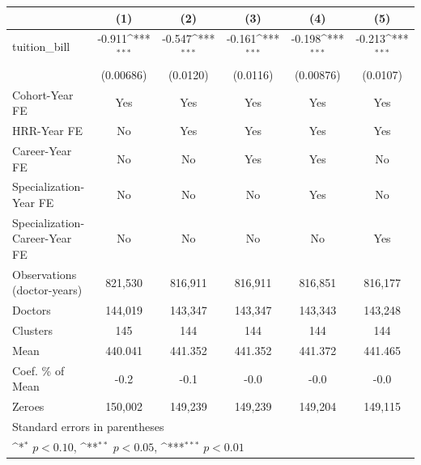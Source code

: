 {
\def\sym#1{\ifmmode^{#1}\else\(^{#1}\)\fi}
\begin{tabular}{l*{5}{c}}
\hline\hline
                    &\multicolumn{1}{c}{(1)}         &\multicolumn{1}{c}{(2)}         &\multicolumn{1}{c}{(3)}         &\multicolumn{1}{c}{(4)}         &\multicolumn{1}{c}{(5)}         \\
\hline
tuition\_bill        &      -0.911\sym{***}&      -0.547\sym{***}&      -0.161\sym{***}&      -0.198\sym{***}&      -0.213\sym{***}\\
                    &   (0.00686)         &    (0.0120)         &    (0.0116)         &   (0.00876)         &    (0.0107)         \\
[1em]
Cohort-Year FE      &         Yes         &         Yes         &         Yes         &         Yes         &         Yes         \\
[1em]
HRR-Year FE         &          No         &         Yes         &         Yes         &         Yes         &         Yes         \\
[1em]
Career-Year FE      &          No         &          No         &         Yes         &         Yes         &          No         \\
[1em]
Specialization-Year FE&          No         &          No         &          No         &         Yes         &          No         \\
[1em]
Specialization-Career-Year FE&          No         &          No         &          No         &          No         &         Yes         \\
\hline
Observations (doctor-years)&     821,530         &     816,911         &     816,911         &     816,851         &     816,177         \\
Doctors             &     144,019         &     143,347         &     143,347         &     143,343         &     143,248         \\
Clusters            &         145         &         144         &         144         &         144         &         144         \\
Mean                &     440.041         &     441.352         &     441.352         &     441.372         &     441.465         \\
Coef. \% of Mean    &        -0.2         &        -0.1         &        -0.0         &        -0.0         &        -0.0         \\
Zeroes              &     150,002         &     149,239         &     149,239         &     149,204         &     149,115         \\
\hline\hline
\multicolumn{6}{l}{\footnotesize Standard errors in parentheses}\\
\multicolumn{6}{l}{\footnotesize \sym{*} \(p<0.10\), \sym{**} \(p<0.05\), \sym{***} \(p<0.01\)}\\
\end{tabular}
}
